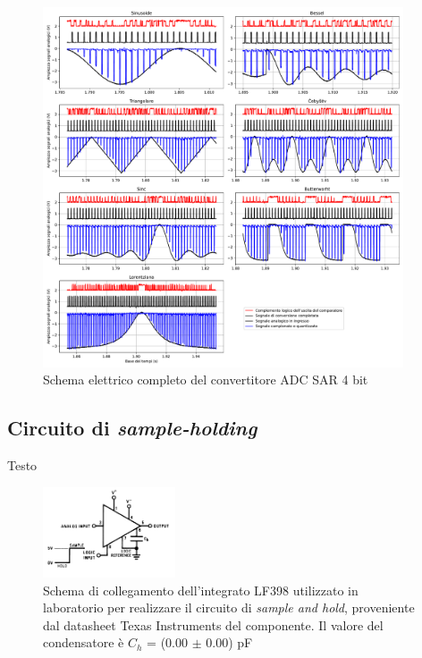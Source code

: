 \documentclass[journal]{IEEEtran}
\begin{document}
\begin{figure}[t]%
\centering
\includegraphics[trim = {30 0 50 0}, width=0.95\textwidth]{analysis/output/waveforms.pdf}
\caption{Schema elettrico completo del convertitore ADC SAR 4 bit}
\label{fig:waveforms_no_sh_scope}
\end{figure}



\subsection{Circuito di \textit{sample-holding}}
Testo

\begin{figure}[H]%
\begin{center}
\includegraphics[width=0.35\textwidth]{sch-simulations/digital/output/lf398.png}
\caption{Schema di collegamento dell'integrato LF398 utilizzato in laboratorio per realizzare il circuito di \textit{sample and hold}, proveniente dal datasheet Texas Instruments del componente. Il valore del condensatore è $C_h$ = (0.00 $\pm$ 0.00) pF}
\label{fig:circuit_sample_and_hold}
\end{center}
\end{figure}
\end{document}
